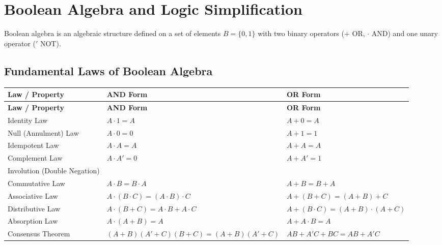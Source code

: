 \documentclass[12pt,a4paper]{article}
\renewcommand{\arraystretch}{1.45}
\begin{document}
\section{Boolean Algebra and Logic Simplification}

Boolean algebra is an algebraic structure defined on a set of elements $B = \{0, 1\}$ with two binary operators ($+$ OR, $\cdot$ AND) and one unary operator ($'$ NOT).

\subsection{Fundamental Laws of Boolean Algebra}
\par\vspace{6pt}\noindent
\begingroup
\setlength{\tabcolsep}{4pt}
\setlength{\extrarowheight}{2.5pt}
\renewcommand{\arraystretch}{1.35}
\begingroup
\setlength{\LTleft}{0pt}
\setlength{\LTright}{0pt}
\begin{longtable}{|B{3.4cm}|>{\small\raggedright\arraybackslash}m{\dimexpr(\linewidth-3.4cm-6\arrayrulewidth)/2\relax}|>{\small\raggedright\arraybackslash}m{\dimexpr(\linewidth-3.4cm-6\arrayrulewidth)/2\relax}|}
\hline
\textbf{Law / Property} & \textbf{AND Form} & \textbf{OR Form} \\
\hline
\endfirsthead
\hline
\textbf{Law / Property} & \textbf{AND Form} & \textbf{OR Form} \\
\hline
\endhead
Identity Law & $A \cdot 1 = A$ & $A + 0 = A$ \\
\hline
Null (Annulment) Law & $A \cdot 0 = 0$ & $A + 1 = 1$ \\
\hline
Idempotent Law & $A \cdot A = A$ & $A + A = A$ \\
\hline
Complement Law & $A \cdot A' = 0$ & $A + A' = 1$ \\
\hline
Involution (Double Negation) &  \\
\hline
Commutative Law & $A \cdot B = B \cdot A$ & $A + B = B + A$ \\
\hline
Associative Law & $A \cdot (B \cdot C) = (A \cdot B) \cdot C$ & $A + (B + C) = (A + B) + C$ \\
\hline
Distributive Law & $A \cdot (B + C) = A \cdot B + A \cdot C$ & $A + (B \cdot C) = (A + B) \cdot (A + C)$ \\
\hline
Absorption Law & $A \cdot (A + B) = A$ & $A + A \cdot B = A$ \\
\hline
Consensus Theorem & $(A+B)(A'+C)(B+C) = (A+B)(A'+C)$ & $AB + A'C + BC = AB + A'C$ \\
\hline
\end{longtable}
\endgroup
\endgroup
\end{document}
